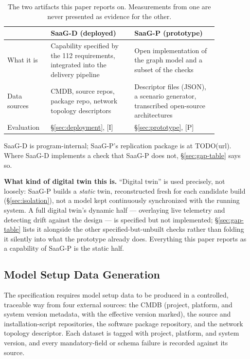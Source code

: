 \documentclass[sigconf,9pt]{acmart}
\begin{document}
\begin{table}[t]
\caption{The two artifacts this paper reports on. Measurements from one are never presented as
evidence for the other.}
\label{tab:artifacts}
\footnotesize
\begin{tabular}{@{}p{0.16\linewidth}p{0.35\linewidth}p{0.35\linewidth}@{}}
\toprule
 & \textbf{SaaG-D (deployed)} & \textbf{SaaG-P (prototype)} \\
\midrule
What it is & Capability specified by the 112 requirements, integrated into the delivery pipeline &
Open implementation of the graph model and a subset of the checks \\
Data sources & CMDB, source repos, package repo, network topology descriptors &
Descriptor files (JSON), a scenario generator, transcribed open-source architectures \\
Evaluation & \S\ref{sec:deployment}, [I] & \S\ref{sec:prototype}, [P] \\
\bottomrule
\end{tabular}
\end{table}

SaaG-D is program-internal; SaaG-P's replication package is at TODO(url). Where SaaG-D implements
a check that SaaG-P does not, \S\ref{sec:gap-table} says so.

\textbf{What kind of digital twin this is.} ``Digital twin'' is used precisely, not loosely: SaaG-P
builds a \emph{static} twin, reconstructed fresh for each candidate build (\S\ref{sec:isolation}),
not a model kept continuously synchronized with the running system. A full digital twin's dynamic
half --- overlaying live telemetry and detecting drift against the design --- is specified but not
implemented; \S\ref{sec:gap-table} lists it alongside the other specified-but-unbuilt checks rather
than folding it silently into what the prototype already does. Everything this paper reports as a
capability of SaaG-P is the static half.

\subsection{Model Setup Data Generation}
\label{sec:msd}

The specification requires model setup data to be produced in a controlled, traceable way from
four external sources: the CMDB (project, platform, and system version metadata, with the
effective version marked), the source and installation-script repositories, the software package
repository, and the network topology descriptor. Each dataset is tagged with project, platform,
and system version, and every mandatory-field or schema failure is recorded against its source.
\end{document}
